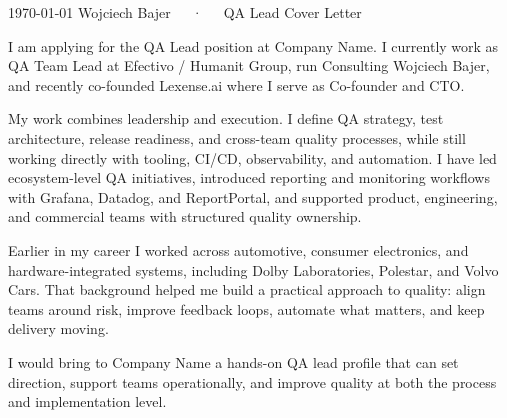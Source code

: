 \documentclass[11pt, a4paper]{awesome-cv}
\begin{document}
\makecvheader[R]
\makecvfooter
  {\today}
  {Wojciech Bajer~~~·~~~QA Lead Cover Letter}
  {}

\makelettertitle

\begin{cvletter}

I am applying for the QA Lead position at Company Name. I currently work as QA Team Lead at Efectivo / Humanit Group, run Consulting Wojciech Bajer, and recently co-founded Lexense.ai where I serve as Co-founder and CTO.

My work combines leadership and execution. I define QA strategy, test architecture, release readiness, and cross-team quality processes, while still working directly with tooling, CI/CD, observability, and automation. I have led ecosystem-level QA initiatives, introduced reporting and monitoring workflows with Grafana, Datadog, and ReportPortal, and supported product, engineering, and commercial teams with structured quality ownership.

Earlier in my career I worked across automotive, consumer electronics, and hardware-integrated systems, including Dolby Laboratories, Polestar, and Volvo Cars. That background helped me build a practical approach to quality: align teams around risk, improve feedback loops, automate what matters, and keep delivery moving.

I would bring to Company Name a hands-on QA lead profile that can set direction, support teams operationally, and improve quality at both the process and implementation level.

\end{cvletter}

\makeletterclosing
\end{document}
